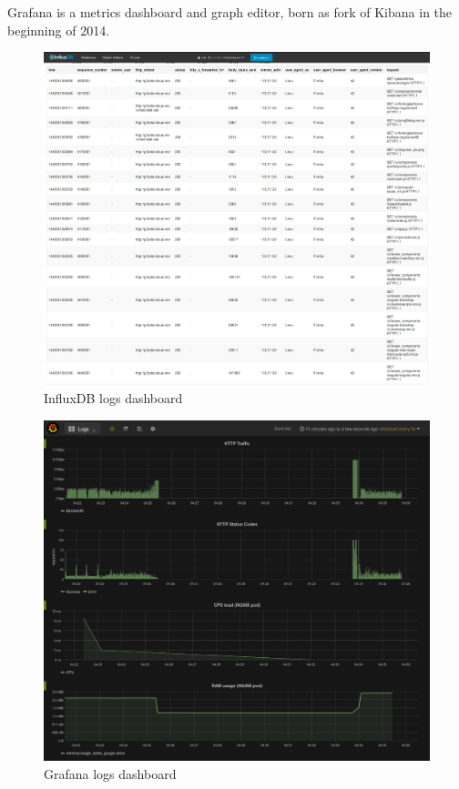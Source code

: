 Grafana is a metrics dashboard and graph editor, born as fork of Kibana
in the beginning of 2014.

\begin{figure}[htbp]
\centering
\includegraphics{media/ch6-influxdb.png}
\caption{InfluxDB logs dashboard}
\end{figure}

\begin{figure}[htbp]
\centering
\includegraphics{media/ch6-grafana.png}
\caption{Grafana logs dashboard}
\end{figure}

